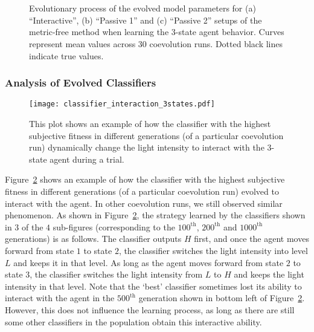 \begin{figure}[!t]%
	\centering
		\\
		\\
		\caption{Evolutionary process of the evolved model parameters for (a) ``Interactive'', (b) ``Passive 1'' and (c) ``Passive 2'' setups of the metric-free method when learning the 3-state agent behavior. Curves represent mean values across 30 coevolution runs. Dotted black lines indicate true values.\label{fig:model_parameters_convergence_stochastic_3states}}
\end{figure}

\subsubsection{Analysis of Evolved Classifiers}
%
\begin{figure}[!t]
\centering
\texttt{[image: classifier\_interaction\_3states.pdf]}
\caption{This plot shows an example of how the classifier with the highest subjective fitness in different generations (of a particular coevolution run) dynamically change the light intensity to interact with the 3-state agent during a trial.}
\label{fig:classifier_interaction_3states}
\end{figure}
%

Figure~\ref{fig:classifier_interaction_3states} shows an example of how the classifier with the highest subjective fitness in different generations (of a particular coevolution run) evolved to interact with the agent. In other coevolution runs, we still observed similar phenomenon. As shown in Figure~\ref{fig:classifier_interaction_3states}, the strategy learned by the classifiers shown in $3$ of the $4$ sub-figures (corresponding to the $100^\mathrm{th}$, $200^\mathrm{th}$ and $1000^\mathrm{th}$ generations) is as follows. The classifier outputs $H$ first, and once the agent moves forward from state $1$ to state $2$, the classifier switches the light intensity into level $L$ and keeps it in that level. As long as the agent moves forward from state $2$ to state $3$, the classifier switches the light intensity from $L$ to $H$ and keeps the light intensity in that level. Note that the `best' classifier sometimes lost its ability to interact with the agent in the $500^\mathrm{th}$ generation shown in bottom left of Figure~\ref{fig:classifier_interaction_3states}. However, this does not influence the learning process, as long as there are still some other classifiers in the population obtain this interactive ability. 


